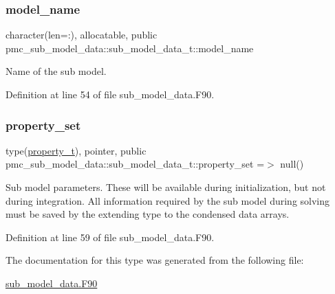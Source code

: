 \subsubsection{\texorpdfstring{model\+\_\+name}{model\_name}}
{\footnotesize\ttfamily character(len=\+:), allocatable, public pmc\+\_\+sub\+\_\+model\+\_\+data\+::sub\+\_\+model\+\_\+data\+\_\+t\+::model\+\_\+name}



Name of the sub model. 



Definition at line 54 of file sub\+\_\+model\+\_\+data.\+F90.

\mbox{\label{structpmc__sub__model__data_1_1sub__model__data__t_aeb00155797966fc95e75ad14d45e7242}} 
\subsubsection{\texorpdfstring{property\+\_\+set}{property\_set}}
{\footnotesize\ttfamily type(\mbox{\hyperlink{structpmc__property_1_1property__t}{property\+\_\+t}}), pointer, public pmc\+\_\+sub\+\_\+model\+\_\+data\+::sub\+\_\+model\+\_\+data\+\_\+t\+::property\+\_\+set =$>$ null()}



Sub model parameters. These will be available during initialization, but not during integration. All information required by the sub model during solving must be saved by the extending type to the condensed data arrays. 



Definition at line 59 of file sub\+\_\+model\+\_\+data.\+F90.



The documentation for this type was generated from the following file\+:\begin{DoxyCompactItemize}
\item 
\mbox{\hyperlink{sub__model__data_8_f90}{sub\+\_\+model\+\_\+data.\+F90}}\end{DoxyCompactItemize}
